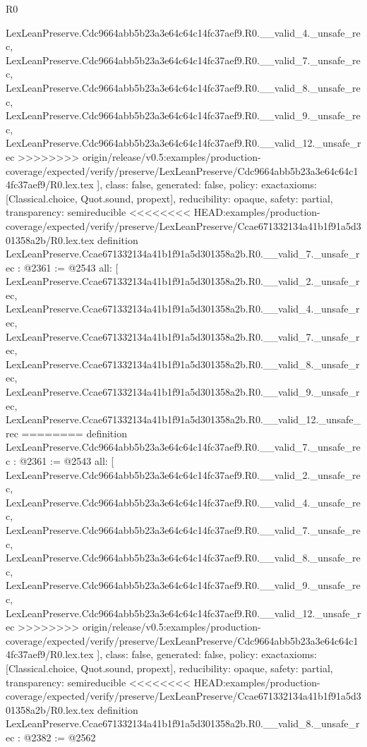 \begin{lexlean}{R0}
\begin{coremodule}
{{{{{{{{{{{{{{{{{{{{{{{{{{{{{{{{{{{{{{{{{{{{{{{{{{{{    LexLeanPreserve.Cdc9664abb5b23a3e64c64c14fc37aef9.R0.__valid_4._unsafe_rec,
    LexLeanPreserve.Cdc9664abb5b23a3e64c64c14fc37aef9.R0.__valid_7._unsafe_rec,
    LexLeanPreserve.Cdc9664abb5b23a3e64c64c14fc37aef9.R0.__valid_8._unsafe_rec,
    LexLeanPreserve.Cdc9664abb5b23a3e64c64c14fc37aef9.R0.__valid_9._unsafe_rec,
    LexLeanPreserve.Cdc9664abb5b23a3e64c64c14fc37aef9.R0.__valid_12._unsafe_rec
>>>>>>>> origin/release/v0.5:examples/production-coverage/expected/verify/preserve/LexLeanPreserve/Cdc9664abb5b23a3e64c64c14fc37aef9/R0.lex.tex
  ],
  class: false,
  generated: false,
  policy: exact{axioms: [Classical.choice, Quot.sound, propext]},
  reducibility: opaque{},
  safety: partial,
  transparency: semireducible
}
<<<<<<<< HEAD:examples/production-coverage/expected/verify/preserve/LexLeanPreserve/Ccae671332134a41b1f91a5d301358a2b/R0.lex.tex
definition LexLeanPreserve.Ccae671332134a41b1f91a5d301358a2b.R0.__valid_7._unsafe_rec : @2361 := @2543 {
  all: [
    LexLeanPreserve.Ccae671332134a41b1f91a5d301358a2b.R0.__valid_2._unsafe_rec,
    LexLeanPreserve.Ccae671332134a41b1f91a5d301358a2b.R0.__valid_4._unsafe_rec,
    LexLeanPreserve.Ccae671332134a41b1f91a5d301358a2b.R0.__valid_7._unsafe_rec,
    LexLeanPreserve.Ccae671332134a41b1f91a5d301358a2b.R0.__valid_8._unsafe_rec,
    LexLeanPreserve.Ccae671332134a41b1f91a5d301358a2b.R0.__valid_9._unsafe_rec,
    LexLeanPreserve.Ccae671332134a41b1f91a5d301358a2b.R0.__valid_12._unsafe_rec
========
definition LexLeanPreserve.Cdc9664abb5b23a3e64c64c14fc37aef9.R0.__valid_7._unsafe_rec : @2361 := @2543 {
  all: [
    LexLeanPreserve.Cdc9664abb5b23a3e64c64c14fc37aef9.R0.__valid_2._unsafe_rec,
    LexLeanPreserve.Cdc9664abb5b23a3e64c64c14fc37aef9.R0.__valid_4._unsafe_rec,
    LexLeanPreserve.Cdc9664abb5b23a3e64c64c14fc37aef9.R0.__valid_7._unsafe_rec,
    LexLeanPreserve.Cdc9664abb5b23a3e64c64c14fc37aef9.R0.__valid_8._unsafe_rec,
    LexLeanPreserve.Cdc9664abb5b23a3e64c64c14fc37aef9.R0.__valid_9._unsafe_rec,
    LexLeanPreserve.Cdc9664abb5b23a3e64c64c14fc37aef9.R0.__valid_12._unsafe_rec
>>>>>>>> origin/release/v0.5:examples/production-coverage/expected/verify/preserve/LexLeanPreserve/Cdc9664abb5b23a3e64c64c14fc37aef9/R0.lex.tex
  ],
  class: false,
  generated: false,
  policy: exact{axioms: [Classical.choice, Quot.sound, propext]},
  reducibility: opaque{},
  safety: partial,
  transparency: semireducible
}
<<<<<<<< HEAD:examples/production-coverage/expected/verify/preserve/LexLeanPreserve/Ccae671332134a41b1f91a5d301358a2b/R0.lex.tex
definition LexLeanPreserve.Ccae671332134a41b1f91a5d301358a2b.R0.__valid_8._unsafe_rec : @2382 := @2562 {
}}}}}}}}}}}}}}}}}}}}}}}}}}}}}}}}}}}}}}}}}}}}}}}}}}}}}
\end{coremodule}
\end{lexlean}

